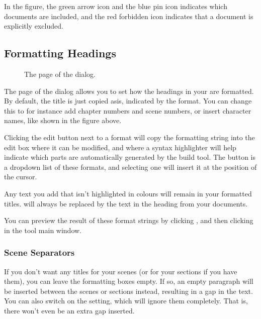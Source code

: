 \documentclass[a4paper,11pt,english]{sphinxmanual}
\begin{document}
\sphinxAtStartPar
In the figure, the green arrow icon and the blue pin icon indicates which documents are included,
and the red forbidden icon indicates that a document is explicitly excluded.


\subsection{Formatting Headings}
\label{\detokenize{project_manuscript:formatting-headings}}\label{\detokenize{project_manuscript:a-manuscript-settings-head}}
\begin{figure}[htbp]
\centering
\capstart

\noindent{}
\caption{The  page of the  dialog.}\label{\detokenize{project_manuscript:id4}}\end{figure}

\sphinxAtStartPar
The  page of the  dialog allows you to set how the
headings in your {\hyperref[\detokenize{int_glossary:term-Novel-Documents}]{}} are formatted. By default, the title is just copied as\sphinxhyphen{}is,
indicated by the  format. You can change this to for instance add chapter numbers and
scene numbers, or insert character names, like shown in the figure above.

\sphinxAtStartPar
Clicking the edit button next to a format will copy the formatting string into the edit box where
it can be modified, and where a syntax highlighter will help indicate which parts are automatically
generated by the build tool. The  button is a dropdown list of these formats, and
selecting one will insert it at the position of the cursor.

\sphinxAtStartPar
Any text you add that isn’t highlighted in colours will remain in your formatted titles.
 will always be replaced by the text in the heading from your documents.

\sphinxAtStartPar
You can preview the result of these format strings by clicking , and then clicking
 in the  tool main window.


\subsubsection{Scene Separators}
\label{\detokenize{project_manuscript:scene-separators}}
\sphinxAtStartPar
If you don’t want any titles for your scenes (or for your sections if you have them), you can leave
the formatting boxes empty. If so, an empty paragraph will be inserted between the scenes or
sections instead, resulting in a gap in the text. You can also switch on the 
setting, which will ignore them completely. That is, there won’t even be an extra gap inserted.
\end{document}
